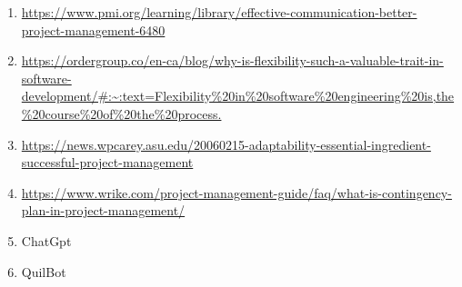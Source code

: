 \documentclass[12pt]{article}
\begin{document}
\begin{thebibliography}
\begin{enumerate}
    \item \footnotesize\url{https://www.pmi.org/learning/library/effective-communication-better-project-management-6480}
    
    \item \footnotesize\url{https://ordergroup.co/en-ca/blog/why-is-flexibility-such-a-valuable-trait-in-software-development/#:~:text=Flexibility%20in%20software%20engineering%20is,the%20course%20of%20the%20process.}
    
    \item \footnotesize\url{https://news.wpcarey.asu.edu/20060215-adaptability-essential-ingredient-successful-project-management}
    
    \item \footnotesize\url{https://www.wrike.com/project-management-guide/faq/what-is-contingency-plan-in-project-management/}
    
    \item ChatGpt 
    
    \item QuilBot

\end{enumerate}





\end{thebibliography}{}
\end{document}

